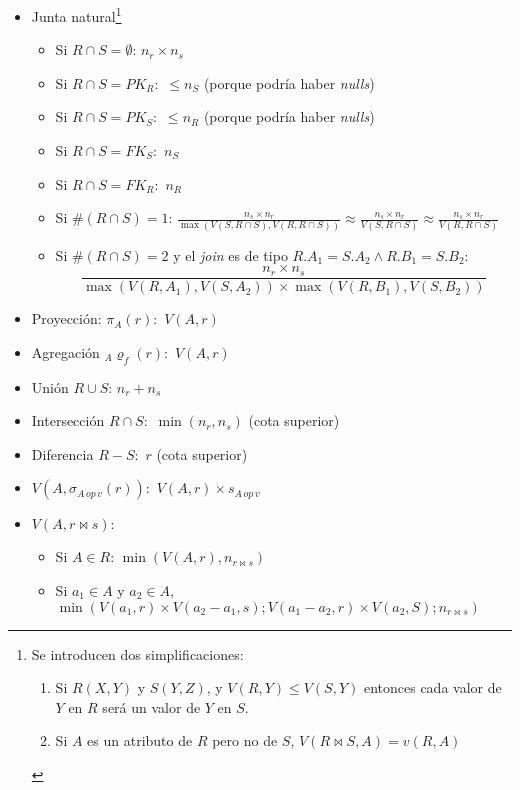 \documentclass[a4paper, twoside]{article}
\begin{document}
\begin{itemize}
	\item Junta natural\footnote{Se introducen dos simplificaciones:
		\begin{enumerate}
			\item Si $R(X,Y)$ y $S(Y,Z)$, y $V(R,Y)\leq V(S,Y)$ entonces cada valor de $Y$ en $R$ será un valor de $Y$ en $S$.
			\item Si $A$ es un atributo de $R$ pero no de $S$, $V\left(R\bowtie S,A\right)=v\left(R,A\right)$
		\end{enumerate}}
	\begin{itemize}
		\item Si $R\cap S=\emptyset$: $n_{r}\times n_{s}$
		\item Si $R\cap S=PK_{R}:$ $\leq n_{S}$ (porque podría haber \emph{nulls})
		\item Si $R\cap S=PK_{S}:$ $\leq n_{R}$ (porque podría haber \emph{nulls})
		\item Si $R\cap S=FK_{S}:$ $n_{S}$
		\item Si $R\cap S=FK_{R}:$ $n_{R}$
		\item Si $\#(R\cap S)=1$: $\frac{n_{s}\times n_{r}}{\max\left(V(S,R\cap S),V(R,R\cap S)\right)}\approx\frac{n_{s}\times n_{r}}{V(S,R\cap S)}\approx\frac{n_{s}\times n_{r}}{V(R,R\cap S)}$
		\item Si $\#(R\cap S)=2$ y el \emph{join} es de tipo $R.A_{1}=S.A_{2}\wedge R.B_{1}=S.B_{2}$:
		\[
			\frac{n_{r} \times n_{s}}{\max \left( V(R,A_{1}), V(S,A_{2}) \right) \times \max \left( V(R,B_{1}), V(S,B_{2}) \right)}
		\]
	\end{itemize}

	\item Proyección: $\pi_{A}(r):$ $V(A,r)$
	\item Agregación $_{A}\varrho_{f}(r):$ $V(A,r)$
	\item Unión $R\cup S$: $n_{r}+n_{s}$
	\item Intersección $R\cap S:$ $\min\left(n_{r},n_{s}\right)$ (cota superior)
	\item Diferencia $R-S:$ $r$ (cota superior)
	\item $V\left(A,\sigma_{A\, op\, v}(r)\right):$ $V(A,r)\times s_{A\, op\, v}$
	\item $V\left(A,r\bowtie s\right):$ 
	\begin{itemize}
		\item Si $A\in R$: $\min\left(V(A,r),n_{r\bowtie s}\right)$
		\item Si $a_{1}\in A$ y $a_{2}\in A$, $\min\left(V(a_{1},r)\times V(a_{2}-a_{1},s);V(a_{1}-a_{2},r)\times V(a_{2},S);n_{r\bowtie s}\right)$
	\end{itemize}
\end{itemize}
\end{document}

